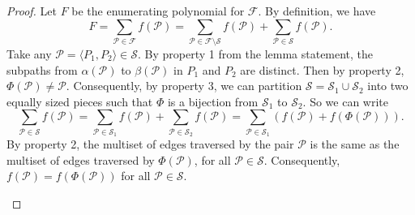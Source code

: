 \documentclass[11pt]{article}
\newcommand{\grp}[1]{\left(#1\right)}
\newcommand{\ca}{\mathcal}
\theoremstyle{definition}
\begin{document}
\begin{proof}
    Let $F$ be the enumerating polynomial for $\ca{F}$.
    By definition, we have 
        \begin{equation}
        \label{enum:def}
        F = \sum_{\ca{P}\in\ca{F}} f(\ca{P}) = \sum_{\ca{P}\in\ca{F}\setminus \ca{S}} f(\ca{P}) + \sum_{\ca{P}\in\ca{S}} f(\ca{P}).
        \end{equation}
Take any $\ca{P} = \langle P_1,P_2\rangle\in \ca{S}$.
By property 1 from the lemma statement, the subpaths from $\alpha(\ca{P})$ to $\beta(\ca{P})$ in $P_1$ and $P_2$ are distinct.
Then by property 2, $\Phi(\ca{P})\neq\ca{P}$.
Consequently, by property 3, we can partition $\ca{S} = \ca{S}_1\cup \ca{S}_2$ into two equally sized pieces such that $\Phi$ is a bijection from $\ca{S}_1$ to $\ca{S}_2$.
So we can write 
    \begin{equation}
    \label{summing-in-half}
    \sum_{\ca{P}\in\ca{S}} f(\ca{P}) = \sum_{\ca{P}\in\ca{S}_1} f(\ca{P}) + \sum_{\ca{P}\in\ca{S}_2} f(\ca{P}) = \sum_{\ca{P}\in\ca{S}_1} \grp{f(\ca{P}) + f(\Phi(\ca{P}))}.
    \end{equation}
By property 2, the multiset of edges traversed by the pair $\ca{P}$ is the same as the multiset of edges traversed by $\Phi(\ca{P})$, for all $\ca{P}\in\ca{S}$.
Consequently, $f(\ca{P}) = f(\Phi(\ca{P}))$ for all $\ca{P}\in \ca{S}$.

\begin{figure}[t]
    \centering
\end{figure}
\end{proof}
\end{document}
